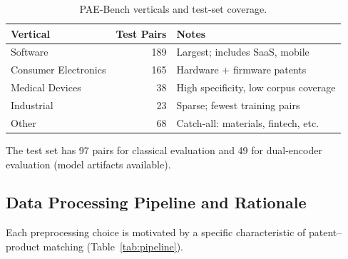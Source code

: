 \documentclass[11pt]{article}
\begin{document}
\begin{table}[h]
\centering
\caption{PAE-Bench verticals and test-set coverage.}
\label{tab:verticals}
\begin{tabular}{lrl}
\toprule
\textbf{Vertical} & \textbf{Test Pairs} & \textbf{Notes} \\
\midrule
Software & 189 & Largest; includes SaaS, mobile \\
Consumer Electronics & 165 & Hardware $+$ firmware patents \\
Medical Devices & 38 & High specificity, low corpus coverage \\
Industrial & 23 & Sparse; fewest training pairs \\
Other & 68 & Catch-all: materials, fintech, etc. \\
\bottomrule
\end{tabular}
\end{table}

The test set has 97 pairs for classical evaluation and 49 for dual-encoder evaluation (model artifacts available).

\subsection{Data Processing Pipeline and Rationale}

Each preprocessing choice is motivated by a specific characteristic of patent--product matching (Table~\ref{tab:pipeline}).
\end{document}
